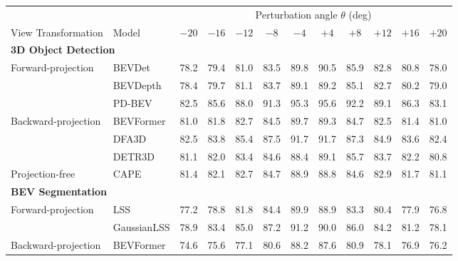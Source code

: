 \begin{table}[t]\centering\footnotesize
\setlength{\tabcolsep}{4pt}
\begin{tabular}{ll cccccccccc}
\toprule
& & \multicolumn{10}{c}{Perturbation angle $\theta$ (deg)}\\
\cmidrule(lr){3-12}
View Transformation & Model & $-20$ & $-16$ & $-12$ & $-8$ & $-4$ & $+4$ & $+8$ & $+12$ & $+16$ & $+20$\\
\midrule
\multicolumn{12}{l}{\textbf{3D Object Detection}}\\
\midrule
\multirow{3}{*}{Forward-projection} & BEVDet & 78.2 & 79.4 & 81.0 & 83.5 & 89.8 & 90.5 & 85.9 & 82.8 & 80.8 & 78.0\\
 & BEVDepth & 78.4 & 79.7 & 81.1 & 83.7 & 89.1 & 89.2 & 85.1 & 82.7 & 80.2 & 79.0\\
 & PD-BEV & 82.5 & 85.6 & 88.0 & 91.3 & 95.3 & 95.6 & 92.2 & 89.1 & 86.3 & 83.1\\
\midrule
\multirow{3}{*}{Backward-projection} & BEVFormer & 81.0 & 81.8 & 82.7 & 84.5 & 89.7 & 89.3 & 84.7 & 82.5 & 81.4 & 81.0\\
 & DFA3D & 82.5 & 83.8 & 85.4 & 87.5 & 91.7 & 91.7 & 87.3 & 84.9 & 83.6 & 82.4\\
 & DETR3D & 81.1 & 82.0 & 83.4 & 84.6 & 88.4 & 89.1 & 85.7 & 83.7 & 82.2 & 80.8\\
\midrule
Projection-free & CAPE & 81.4 & 82.1 & 82.7 & 84.7 & 88.9 & 88.8 & 84.6 & 82.9 & 81.7 & 81.1\\
\midrule
\multicolumn{12}{l}{\textbf{BEV Segmentation}}\\
\midrule
\multirow{2}{*}{Forward-projection} & LSS & 77.2 & 78.8 & 81.8 & 84.4 & 89.9 & 88.9 & 83.3 & 80.4 & 77.9 & 76.8\\
 & GaussianLSS & 78.9 & 83.4 & 85.0 & 87.2 & 91.2 & 90.0 & 86.0 & 84.2 & 81.2 & 78.1\\
\midrule
\multirow{2}{*}{Backward-projection} & BEVFormer & 74.6 & 75.6 & 77.1 & 80.6 & 88.2 & 87.6 & 80.9 & 78.1 & 76.9 & 76.2\\

\end{tabular}
\end{table}
